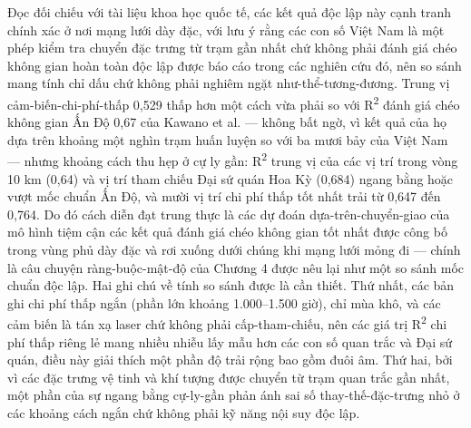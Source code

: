 Đọc đối chiếu với tài liệu khoa học quốc tế, các kết quả độc lập này cạnh tranh chính xác ở nơi mạng lưới dày đặc, với lưu ý rằng các con số Việt Nam là một phép kiểm tra chuyển đặc trưng từ trạm gần nhất chứ không phải đánh giá chéo không gian hoàn toàn độc lập được báo cáo trong các nghiên cứu đó, nên so sánh mang tính chỉ dấu chứ không phải nghiêm ngặt như-thể-tương-đương. Trung vị cảm-biến-chi-phí-thấp 0,529 thấp hơn một cách vừa phải so với R\textsuperscript{2} đánh giá chéo không gian Ấn Độ 0,67 của Kawano et al. \cite{kawano2025} --- không bất ngờ, vì kết quả của họ dựa trên khoảng một nghìn trạm huấn luyện so với ba mươi bảy của Việt Nam --- nhưng khoảng cách thu hẹp ở cự ly gần: R\textsuperscript{2} trung vị của các vị trí trong vòng 10 km (0,64) và vị trí tham chiếu Đại sứ quán Hoa Kỳ (0,684) ngang bằng hoặc vượt mốc chuẩn Ấn Độ, và mười vị trí chi phí thấp tốt nhất trải từ 0,647 đến 0,764. Do đó cách diễn đạt trung thực là các dự đoán dựa-trên-chuyển-giao của mô hình tiệm cận các kết quả đánh giá chéo không gian tốt nhất được công bố trong vùng phủ dày đặc và rơi xuống dưới chúng khi mạng lưới mỏng đi --- chính là câu chuyện ràng-buộc-mật-độ của Chương 4 được nêu lại như một so sánh mốc chuẩn độc lập. Hai ghi chú về tính so sánh được là cần thiết. Thứ nhất, các bản ghi chi phí thấp ngắn (phần lớn khoảng 1.000--1.500 giờ), chỉ mùa khô, và các cảm biến là tán xạ laser chứ không phải cấp-tham-chiếu, nên các giá trị R\textsuperscript{2} chi phí thấp riêng lẻ mang nhiều nhiễu lấy mẫu hơn các con số quan trắc và Đại sứ quán, điều này giải thích một phần độ trải rộng bao gồm đuôi âm. Thứ hai, bởi vì các đặc trưng vệ tinh và khí tượng được chuyển từ trạm quan trắc gần nhất, một phần của sự ngang bằng cự-ly-gần phản ánh sai số thay-thế-đặc-trưng nhỏ ở các khoảng cách ngắn chứ không phải kỹ năng nội suy độc lập.

